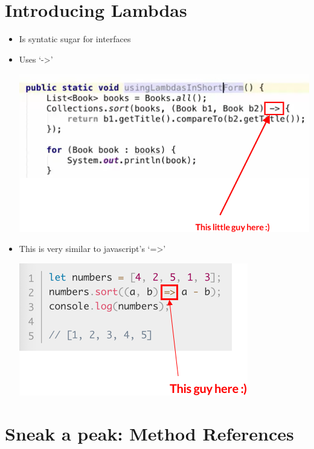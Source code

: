 \documentclass[12pt]{article}
\begin{document}
\bigskip

\section{Introducing Lambdas}

\bigskip

\begin{itemize}
    \item Is syntatic sugar for interfaces
    \item Uses `-\textgreater'

    \begin{center}
    \includegraphics[width=0.8\linewidth]{images/part_1_notes_3.png}
    \end{center}

    \item This is very similar to javascript's `=\textgreater'

    \begin{center}
    \includegraphics[width=0.8\linewidth]{images/part_1_notes_4.png}
    \end{center}

\end{itemize}

\bigskip

\section{Sneak a peak: Method References}
\end{document}
